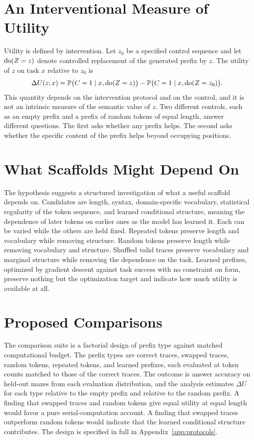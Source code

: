 \section{An Interventional Measure of Utility}

Utility is defined by intervention. Let $z_0$ be a specified control sequence and let $\operatorname{do}(Z=z)$ denote controlled replacement of the generated prefix by $z$. The utility of $z$ on task $x$ relative to $z_0$ is
\[
\Delta U(z;x)=\mathbb{P}\big(C=1\mid x,\operatorname{do}(Z=z)\big)-\mathbb{P}\big(C=1\mid x,\operatorname{do}(Z=z_0)\big).
\]
This quantity depends on the intervention protocol and on the control, and it is not an intrinsic measure of the semantic value of $z$. Two different controls, such as an empty prefix and a prefix of random tokens of equal length, answer different questions. The first asks whether any prefix helps. The second asks whether the specific content of the prefix helps beyond occupying positions.

\section{What Scaffolds Might Depend On}

The hypothesis suggests a structured investigation of what a useful scaffold depends on. Candidates are length, syntax, domain-specific vocabulary, statistical regularity of the token sequence, and learned conditional structure, meaning the dependence of later tokens on earlier ones as the model has learned it. Each can be varied while the others are held fixed. Repeated tokens preserve length and vocabulary while removing structure. Random tokens preserve length while removing vocabulary and structure. Shuffled valid traces preserve vocabulary and marginal structure while removing the dependence on the task. Learned prefixes, optimized by gradient descent against task success with no constraint on form, preserve nothing but the optimization target and indicate how much utility is available at all.

\section{Proposed Comparisons}

The comparison suite is a factorial design of prefix type against matched computational budget. The prefix types are correct traces, swapped traces, random tokens, repeated tokens, and learned prefixes, each evaluated at token counts matched to those of the correct traces. The outcome is answer accuracy on held-out mazes from each evaluation distribution, and the analysis estimates $\Delta U$ for each type relative to the empty prefix and relative to the random prefix. A finding that swapped traces and random tokens give equal utility at equal length would favor a pure serial-computation account. A finding that swapped traces outperform random tokens would indicate that the learned conditional structure contributes. The design is specified in full in Appendix~\ref{app:protocols}.

